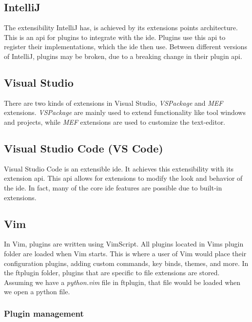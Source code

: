 \subsection{IntelliJ}

The extensibility IntelliJ has, is achieved by its extensions points
architecture. This is an \gls*{api} for plugins to integrate with the
\gls*{ide}. Plugins use this \gls*{api} to register their implementations, which
the \gls*{ide} then use. Between different versions of IntelliJ, plugins may be
broken, due to a breaking change in their plugin \gls*{api}.


\subsection{Visual Studio}

There are two kinds of extensions in Visual Studio, \textit{VSPackage} and
\textit{MEF} extensions. \textit{VSPackage} are mainly used to extend
functionality like tool windows and projects, while \textit{MEF} extensions are
used to customize the text-editor.

\subsection{Visual Studio Code (VS Code)}

Visual Studio Code is an extensible \gls*{ide}. It achieves this extensibility
with its extension \gls*{api}. This \gls*{api} allows for extensions to modify
the look and behavior of the \gls*{ide}. In fact, many of the core \gls*{ide}
features are possible due to built-in extensions.


\subsection{Vim}

In Vim, plugins are written using VimScript. All plugins located in Vims plugin
folder are loaded when Vim starts. This is where a user of Vim would place their
configuration plugins, adding custom commands, key binds, themes, and more. In
the ftplugin folder, plugins that are specific to file extensions are stored.
Assuming we have a \textit{python.vim} file in ftplugin, that file would be
loaded when we open a python file.

\subsubsection{Plugin management}

